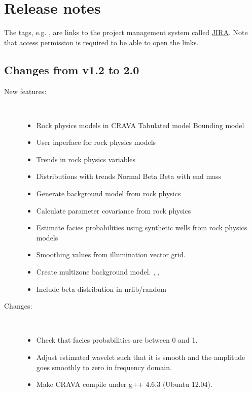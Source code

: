 \chapter{Release notes}
The tags, e.g. , are links to the \crava project management
system called
\href{http://www.atlassian.com/software/jira/}{JIRA}.
 Note that access permission is
required to be able to open the links.

\section{Changes from v1.2 to 2.0}

\begin{description}
\item [New features:] \mbox{ }
  \begin{itemize}
    \item Rock physics models in CRAVA
      \subitem Tabulated model
      \subitem Bounding model
    \item User inperface for rock physics models
    \item Trends in rock physics variables
    \item Distributions with trends
      \subitem Normal
      \subitem Beta
      \subitem Beta with end mass
    \item Generate background model from rock physics
    \item Calculate parameter covariance from rock physics
    \item Estimate facies probabilities using synthetic wells from rock physics models
    \item Smoothing values from illumination vector grid. 
    \item Create multizone background model. ,  , 
    \item Include beta distribution in nrlib/random 
 \end{itemize}

\item [Changes:] \mbox{ }
  \begin{itemize}
   \item Check that facies probabilities are between 0 and 1. 
   \item Adjust estimated wavelet such that it is smooth and the amplitude goes smoothly to zero in frequency domain. 
   \item Make CRAVA compile under g++ 4.6.3 (Ubuntu 12.04). 
 \end{itemize}


\end{description}
